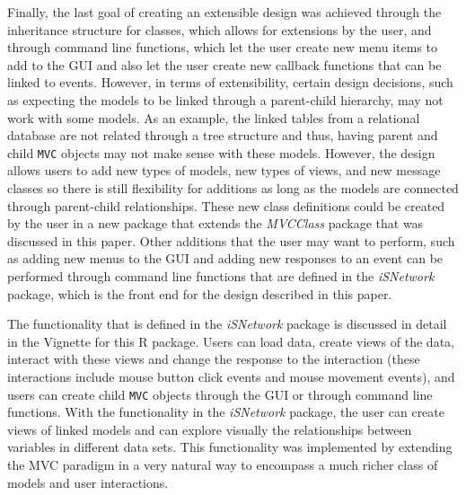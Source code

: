 \documentclass[11pt]{article}
\newcommand{\Robject}[1]{{\texttt{#1}}}
\newcommand{\Rpackage}[1]{{\textit{#1}}}
\begin{document}
Finally, the last goal of creating an extensible design was achieved through
the inheritance structure for classes, which allows for extensions by the
user, and through command line functions, which let the user create new menu
items to add to the GUI and also let the user create new callback functions
that can be linked to events.  However, in terms of extensibility, certain
design decisions, such as expecting the models to be linked through a
parent-child hierarchy, may not work with some models.  As an example, the
linked tables from a relational database are not related through a tree
structure and thus, having parent and child \Robject{MVC} objects may not make
sense with these models.  However, the design allows users to add new types
of models, new types of views, and new message classes so there is still
flexibility for additions as long as the models are connected through
parent-child relationships.  These new class definitions could be created by
the user in a new package that extends the \Rpackage{MVCClass} package that
was discussed in this paper.  Other additions that the user may want to
perform, such as adding new menus to the GUI and adding new responses to an
event can be performed through command line functions that are defined in the
\Rpackage{iSNetwork} package, which is the front end for the design
described in this paper. 

The functionality that is defined in the \Rpackage{iSNetwork} package is
discussed in detail in the Vignette for this R package.  Users can load data,
create views of the data, interact with these views and change the response to
the interaction (these interactions include mouse button click events and
mouse movement events), and users can create child \Robject{MVC} objects
through the GUI or through command line functions.  With the functionality in
the \Rpackage{iSNetwork} package, the user can create views of linked models
and can explore visually the relationships between variables in different data
sets.  This functionality was implemented by extending the MVC paradigm in a
very natural way to encompass a much richer class of models and user
interactions. 


\end{document}
